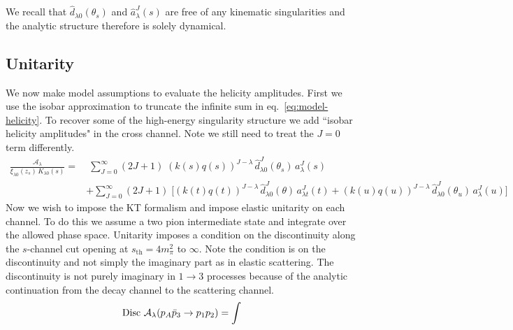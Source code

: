 \documentclass[aps,prd,amsmath,amssymb,superscriptaddress,onecolumn,
nofootinbib,showpacs,preprintnumbers]{revtex4-1}
\begin{document}
We recall that \(\hat{d}_{\lambda 0}(\theta_s)\) and \(\hat{a}_\lambda^J(s)\) are free of any kinematic singularities and the analytic structure therefore is solely dynamical.
\subsection{Unitarity}
We now make model assumptions to evaluate the helicity amplitudes. First we use the isobar approximation to truncate the infinite sum in eq.~\ref{eq:model-helicity}. To recover some of the high-energy singularity structure we add ``isobar helicity amplitudes" in the cross channel. Note we still need to treat the \(J=0\) term differently.
%
  \begin{align}
    \label{eq:isobar}
    \frac{\mathcal{A}_\lambda}{ \xi_{\lambda0}(z_s) \, K_{\lambda 0}(s)} =& \; \sum_{J=0}^\infty (2J+1) \; (k(s)q(s))^{J-\lambda} \, \hat{d}_{\lambda0}^J(\theta_s) \, a^J_{\lambda}(s) \nonumber  \\
    &+\sum_{J=0}^\infty (2J+1) \; \bigg[(k(t)q(t))^{J-\lambda} \, \hat{d}_{\lambda0}^J(\theta) \, a^J_{\lambda t}(t) + (k(u)q(u))^{J-\lambda} \, \hat{d}_{\lambda0}^J(\theta_u) \, a^J_{\lambda}(u) \bigg]
  \end{align}
%
Now we wish to impose the KT formalism and impose elastic unitarity on each channel. To do this we assume a two pion intermediate state and integrate over the allowed phase space. Unitarity imposes a condition on the discontinuity along the \(s\)-channel cut opening at \(s_{\text{th}} = 4m_\pi^2\) to \(\infty\). Note the condition is on the discontinuity and not simply the imaginary part as in elastic scattering. The discontinuity is not purely imaginary in \(1 \to 3\) processes because of the analytic continuation from the decay channel to the scattering channel.
%
  \begin{align}
    \label{eq:unitarity}
    \text{Disc } \mathcal{A}_\lambda(p_A \bar{p}_3 \to p_1 p_2 ) = \int
  \end{align}
%
\end{document}

